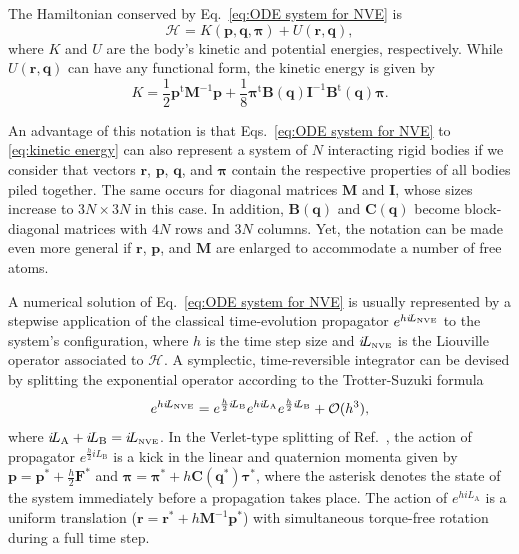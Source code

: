 \documentclass[journal=jctcce,manuscript=article,layout=twocolumn]{achemso}
\newcommand{\mt}[1]{\boldsymbol{\mathbf{#1}}}   %
\newcommand{\vt}[1]{\boldsymbol{\mathbf{#1}}}   %
\newcommand{\tr}[1]{#1^\text{t}}                %
\newcommand{\Ham}[1]{{\mathcal H}_\text{#1}}    %
\newcommand{\Liu}[1]{i\!L_\text{#1}}            %
\newcommand{\timestep}{h}
\begin{document}
The Hamiltonian conserved by Eq.~\eqref{eq:ODE system for NVE} is
\begin{equation}
\label{eq:Hamiltonian}
\Ham{} = K(\vt p, \vt q, \vt \pi) + U(\vt r,\vt q),
\end{equation}
where $K$ and $U$ are the body's kinetic and potential energies, respectively. While $U(\vt r, \vt q)$ can have any functional form, the kinetic energy is given by
\begin{equation}
\label{eq:kinetic energy}
K = \frac{1}{2} \tr{\vt p} {\mt M}^{-1} {\vt p} + \frac{1}{8} \tr{\vt \pi} {\mt B}(\vt q) {\mt I}^{-1} \tr{\mt B}(\vt q) {\vt \pi}.
\end{equation}

An advantage of this notation is that Eqs.~\eqref{eq:ODE system for NVE} to \eqref{eq:kinetic energy} can also represent a system of $N$ interacting rigid bodies if we consider that vectors $\vt r$, $\vt p$, $\vt q$, and $\vt \pi$ contain the respective properties of all bodies piled together. The same occurs for diagonal matrices $\mt M$ and $\mt I$, whose sizes increase to $3N \times 3N$ in this case. In addition, $\mt B(\vt q)$ and $\mt C(\vt q)$ become block-diagonal matrices with $4N$ rows and $3N$ columns. Yet, the notation can be made even more general if $\vt r$, $\vt p$, and $\mt M$ are enlarged to accommodate a number of free atoms.

A numerical solution of Eq.~\eqref{eq:ODE system for NVE} is usually represented by a stepwise application of the classical time-evolution propagator \cite{Tuckerman_2010} $e^{\timestep \Liu{\tiny NVE}}$ to the system's configuration, where $\timestep$ is the time step size and $\Liu{\tiny NVE}$ is the Liouville operator associated to $\Ham{}$. A symplectic, time-reversible integrator can be devised by splitting the exponential operator according to the Trotter-Suzuki formula \cite{Trotter_1959, Suzuki_1976}
\begin{equation}
\label{eq:splitting NVE}
e^{\timestep \Liu{\tiny NVE}} = e^{\frac{\timestep}{2} \Liu{B}} e^{\timestep \Liu{A}} e^{\frac{\timestep}{2} \Liu{B}} + \mathcal{O}(\timestep^3),
\end{equation}
where $\Liu{A} + \Liu{B} = \Liu{\tiny NVE}$. In the Verlet-type splitting of Ref.~, the action of propagator $e^{\frac{\timestep}{2} \Liu{B}}$ is a kick in the linear and quaternion momenta given by ${\vt p} = {\vt p}^\ast + \frac{\timestep}{2} {\vt F}^\ast$ and ${\vt \pi} = {\vt \pi}^\ast + \timestep {\mt C}({\vt q^\ast}) {\vt \tau}^\ast$, where the asterisk denotes the state of the system immediately before a propagation takes place. The action of $e^{\timestep \Liu{A}}$ is a uniform translation (${\vt r} = {\vt r}^\ast + \timestep {\mt M}^{-1} {\vt p}^\ast$) with simultaneous torque-free rotation during a full time step. 
\end{document}
